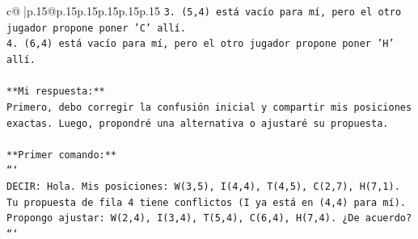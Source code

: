 \documentclass{article}
\begin{document}
{\begin{supertabular}{c@{$\;$}|p{.15\linewidth}@{}p{.15\linewidth}p{.15\linewidth}p{.15\linewidth}p{.15\linewidth}p{.15\linewidth}}
{{{\texttt{3. (5,4) está vacío para mí, pero el otro jugador propone poner 'C' allí.} \\
\texttt{4. (6,4) está vacío para mí, pero el otro jugador propone poner 'H' allí.} \\
\\ 
\texttt{**Mi respuesta:**} \\
\texttt{Primero, debo corregir la confusión inicial y compartir mis posiciones exactas. Luego, propondré una alternativa o ajustaré su propuesta.} \\
\\ 
\texttt{**Primer comando:**} \\
\texttt{```} \\
\texttt{DECIR: Hola. Mis posiciones: W(3,5), I(4,4), T(4,5), C(2,7), H(7,1). Tu propuesta de fila 4 tiene conflictos (I ya está en (4,4) para mí). Propongo ajustar: W(2,4), I(3,4), T(5,4), C(6,4), H(7,4). ¿De acuerdo?} \\
\texttt{```} \\
            }
        }
    }
     \\ \\


\end{supertabular}}
\end{document}
